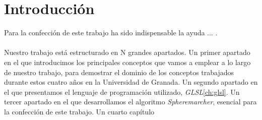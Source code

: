 \chapter*{Introducción}
Para la confección de este trabajo ha sido indispensable la ayuda ... .\\\\
Nuestro trabajo está estructurado en N grandes apartados. Un primer apartado en el que introducimos los principales conceptos que vamos a emplear a lo largo de nuestro trabajo, para demostrar el dominio de los conceptos trabajados durante estos cuatro años en la Universidad de Granada. Un segundo apartado en el que presentamos el lenguaje de programación utilizado, \textit{GLSL}\ref{ch:glsl}. Un tercer apartado en el que desarrollamos el algoritmo \textit{Spheremarcher}, esencial para la confección de este trabajo. Un cuarto capítulo 
